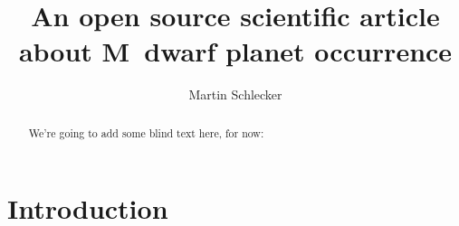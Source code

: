 \documentclass[twocolumn]{aastex631}
\begin{document}
\title{An open source scientific article about M~dwarf planet occurrence}

\author[0000-0000-0000-0000]{Martin Schlecker}

\begin{abstract}
    We're going to add some blind text here, for now:
    \blindtext
\end{abstract}

\section{Introduction}
\Blindtext[4]
\end{document}
